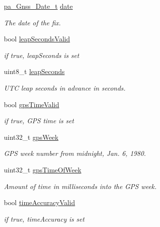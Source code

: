 \begin{DoxyCompactItemize}
\hyperlink{structpa___gnss___date__t}{pa\+\_\+\+Gnss\+\_\+\+Date\+\_\+t} \hyperlink{structpa___gnss___position__t_aa761a9e3307073d4a54c699635ed6c2c}{date}
\begin{DoxyCompactList}\small\item\em The date of the fix. \end{DoxyCompactList}\item 
bool \hyperlink{structpa___gnss___position__t_ab5054e63e1f3428359ac852e412ad99c}{leap\+Seconds\+Valid}
\begin{DoxyCompactList}\small\item\em if true, leap\+Seconds is set \end{DoxyCompactList}\item 
uint8\+\_\+t \hyperlink{structpa___gnss___position__t_ae648725ad4a96e7829c1be80e5c98d48}{leap\+Seconds}
\begin{DoxyCompactList}\small\item\em U\+TC leap seconds in advance in seconds. \end{DoxyCompactList}\item 
bool \hyperlink{structpa___gnss___position__t_aa3246ace3c59147dbd7f9de233a15d76}{gps\+Time\+Valid}
\begin{DoxyCompactList}\small\item\em if true, G\+PS time is set \end{DoxyCompactList}\item 
uint32\+\_\+t \hyperlink{structpa___gnss___position__t_a636a8446ec14317d241e0dbd9f304bfd}{gps\+Week}
\begin{DoxyCompactList}\small\item\em G\+PS week number from midnight, Jan. 6, 1980. \end{DoxyCompactList}\item 
uint32\+\_\+t \hyperlink{structpa___gnss___position__t_a299295553577bdc6b866c615518e4e61}{gps\+Time\+Of\+Week}
\begin{DoxyCompactList}\small\item\em Amount of time in milliseconds into the G\+PS week. \end{DoxyCompactList}\item 
bool \hyperlink{structpa___gnss___position__t_a766f04eee679c54c9a0879790af9e091}{time\+Accuracy\+Valid}
\begin{DoxyCompactList}\small\item\em if true, time\+Accuracy is set \end{DoxyCompactList}\item 

\end{DoxyCompactItemize}
